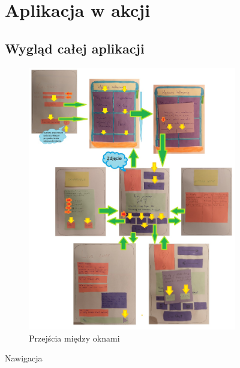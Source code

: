 \documentclass[12pt]{article}
\begin{document}
\begin{figure}[h!]
	\section {Aplikacja w akcji}
	\subsection{Wygląd całej aplikacji}
	\centering
	\begin{subfigure}[b]{1\linewidth}
		\includegraphics[width=\linewidth]{zdj/mozaika.jpg}
		\caption{Przejścia między oknami}
	\end{subfigure}
	\label{fig:nuty}
	\caption{Nawigacja}
\end{figure}

\clearpage
\end{document}
